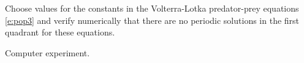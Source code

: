 \documentclass{ximera}
\begin{document}
\begin{computerExercise} \label{c9.1.4}
Choose values for the constants in the Volterra-Lotka predator-prey equations 
\eqref{e:pop3} and verify numerically that there are no periodic solutions in 
the first quadrant for these equations.

\begin{solution}
Computer experiment.

\end{solution}
\end{computerExercise}
\end{document}
